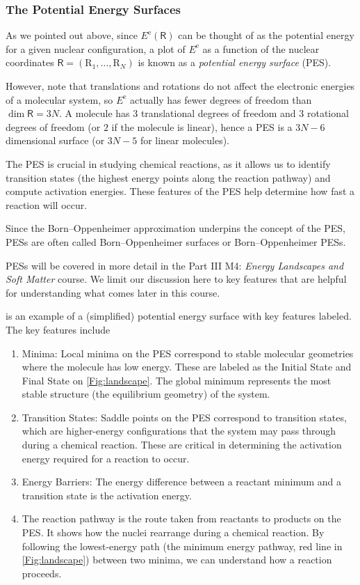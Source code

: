 \documentclass{article}
\theoremstyle{plain}\theoremheaderfont{\normalfont\itshape}\theorembodyfont{\rmfamily}\theoremseparator{.}\newtheorem*{rem}{Remark}\newtheorem*{ex}{Example}\newtheorem*{proof}{Proof}\newtheorem*{altp}{Alternative proof}
\theoremstyle{plain}\theoremheaderfont{\normalfont\bfseries}\theorembodyfont{\rmfamily}\theoremseparator{.}\newtheorem{thm}{Theorem}[section]\newtheorem{lem}[thm]{Lemma}\newtheorem{prop}[thm]{Proposition}\newtheorem*{cor}{Corollary}\newtheorem{defn}[thm]{Definition}\newtheorem{clm}[thm]{Claim}\newtheorem{clminproof}{Claim}\newtheorem{pos}{Postulate}[section]
\theoremstyle{break}\theoremheaderfont{\normalfont\itshape}\theorembodyfont{\rmfamily}\theoremseparator{.\medskip}\newtheorem*{proofskip}{Proof}\newtheorem*{exs}{Examples}\newtheorem*{rems}{Remarks}
\theoremstyle{break}\theoremheaderfont{\normalfont\bfseries}\theorembodyfont{\rmfamily}\theoremseparator{.\medskip}\newtheorem{lemskip}[thm]{Lemma}\newtheorem{defnskip}[thm]{Definition}\newtheorem{propskip}[thm]{Proposition}\newtheorem{thmskip}[thm]{Theorem}
\numberwithin{equation}{section}
\newcommand{\vb}[1]{\bm{\mathrm{#1}}}
\newcommand{\e}{^{\text{e}}}
\begin{document}
    \subsubsection{The Potential Energy Surfaces}
    As we pointed out above, since \(E\e(\mathsf{R})\) can be thought of as the potential energy for a given nuclear configuration, a plot of \(E\e\) as a function of the nuclear coordinates \(\mathsf{R}=(\vb{R}_1,\dots,\vb{R}_N)\) is known as a \textit{potential energy surface} (PES).

    However, note that translations and rotations do not affect the electronic energies of a molecular system, so \(E\e\) actually has fewer degrees of freedom than \(\dim\mathsf{R}=3N\). A molecule has \(3\) translational degrees of freedom and \(3\) rotational degrees of freedom (or \(2\) if the molecule is linear), hence a PES is a \(3N-6\) dimensional surface (or \(3N-5\) for linear molecules).

    The PES is crucial in studying chemical reactions, as it allows us to identify transition states (the highest energy points along the reaction pathway) and compute activation energies. These features of the PES help determine how fast a reaction will occur.
    
    Since the Born--Oppenheimer approximation underpins the concept of the PES, PESs are often called Born--Oppenheimer surfaces or Born--Oppenheimer PESs.

    PESs will be covered in more detail in the Part III M4: \textit{Energy Landscapes and Soft Matter} course. We limit our discussion here to key features that are helpful for understanding what comes later in this course.

     is an example of a (simplified) potential energy surface with key features labeled. The key features include
    \begin{enumerate}[topsep=0pt,label=(\roman*)]
        \item Minima: Local minima on the PES correspond to stable molecular geometries where the molecule has low energy. These are labeled as the Initial State and Final State on \cref{Fig:landscape}. The global minimum represents the most stable structure (the equilibrium geometry) of the system.
        \item Transition States: Saddle points on the PES correspond to transition states, which are higher-energy configurations that the system may pass through during a chemical reaction. These are critical in determining the activation energy required for a reaction to occur.
        \item Energy Barriers: The energy difference between a reactant minimum and a transition state is the activation energy.
        \item The reaction pathway is the route taken
        from reactants to products on the PES. It shows how the nuclei rearrange during a chemical reaction. By following the lowest-energy path (the minimum energy pathway, red line in \cref{Fig:landscape}) between two minima, we can understand how a reaction proceeds.
    \end{enumerate}
\end{document}
